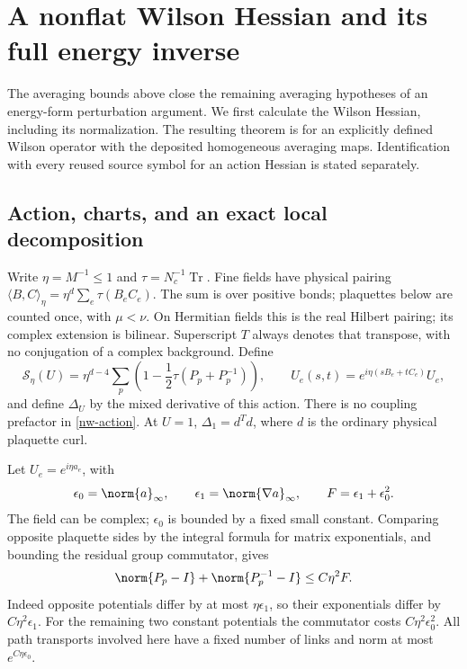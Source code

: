 
\section{A nonflat Wilson Hessian and its full energy inverse}
\label{nw-section}

The averaging bounds above close the remaining averaging hypotheses
of an energy-form perturbation argument. We first calculate the
Wilson Hessian, including its normalization. The resulting theorem
is for an explicitly defined Wilson operator with the deposited
homogeneous averaging maps. Identification with every reused source
symbol for an action Hessian is stated separately.

\subsection{Action, charts, and an exact local decomposition}
\label{nw-wilson}

Write $\eta=M^{-1}\le1$ and $\tau=N_c^{-1}\operatorname{Tr}$.
Fine fields have physical pairing
$\langle B,C\rangle_\eta=\eta^d\sum_e\tau(B_eC_e)$.
The sum is over positive bonds; plaquettes below are counted once,
with $\mu<\nu$. On Hermitian fields this is the real Hilbert pairing;
its complex extension is bilinear. Superscript $T$ always denotes
that transpose, with no conjugation of a complex background.
Define
\begin{equation}\label{nw-action}
 \mathcal S_\eta(U)=\eta^{d-4}\sum_p
   \left(1-\frac12\tau(P_p+P_p^{-1})\right),\qquad
 U_e(s,t)=e^{i\eta(sB_e+tC_e)}U_e,
\end{equation}
and define $\Delta_U$ by the mixed derivative of this action.
There is no coupling prefactor in \eqref{nw-action}. At $U=1$,
$\Delta_1=d^Td$, where $d$ is the ordinary physical plaquette curl.

Let $U_e=e^{i\eta a_e}$, with
\begin{equation}\label{nw-sizes}
 \epsilon_0=\norm{a}_\infty,\qquad
 \epsilon_1=\norm{\nabla a}_\infty,\qquad
 F=\epsilon_1+\epsilon_0^2.
\end{equation}
The field can be complex; $\epsilon_0$ is bounded by a fixed small
constant. Comparing opposite plaquette sides by the integral formula
for matrix exponentials, and bounding the residual group commutator,
gives
\begin{equation}\label{nw-plaquette}
 \norm{P_p-I}+\norm{P_p^{-1}-I}\le C\eta^2F.
\end{equation}
Indeed opposite potentials differ by at most $\eta\epsilon_1$,
so their exponentials differ by $C\eta^2\epsilon_1$.
For the remaining two constant potentials the commutator costs
$C\eta^2\epsilon_0^2$. All path transports involved here have a
fixed number of links and norm at most $e^{C\eta\epsilon_0}$.

